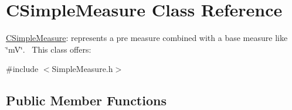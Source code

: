 \hypertarget{classCSimpleMeasure}{}\section{C\+Simple\+Measure Class Reference}
\label{classCSimpleMeasure}


\hyperlink{classCSimpleMeasure}{C\+Simple\+Measure}\+: represents a pre measure combined with a base measure like \char`\"{}m\+V\char`\"{}.~\newline
 This class offers\+:  




{\ttfamily \#include $<$Simple\+Measure.\+h$>$}

\subsection*{Public Member Functions}

